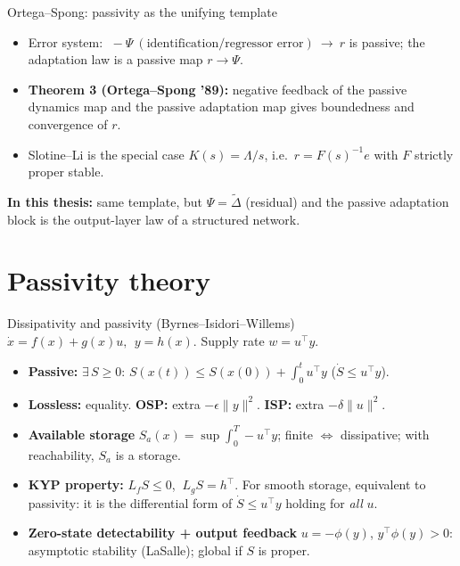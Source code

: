 \documentclass[aspectratio=169,10pt]{beamer}
\begin{document}
\begin{frame}{Ortega--Spong: passivity as the unifying template}
\begin{itemize}
\item Error system: $\;-\Psi\ (\text{identification/regressor error})\ \to\ r$ is passive; the adaptation law is a passive map $r\to\Psi$.
\item \textbf{Theorem 3 (Ortega--Spong '89):} negative feedback of the passive dynamics map and the passive adaptation map gives boundedness and convergence of $r$.
\item Slotine--Li is the special case $K(s)=\Lambda/s$, i.e.\ $r=F(s)^{-1}e$ with $F$ strictly proper stable.
\end{itemize}
\vspace{1mm}
\begin{center}
\end{center}
\textbf{In this thesis:} same template, but $\Psi=\tilde\Delta$ (residual) and the passive adaptation block is the output-layer law of a structured network.
\end{frame}

\section{Passivity theory}
\begin{frame}{Dissipativity and passivity (Byrnes--Isidori--Willems)}
$\dot x=f(x)+g(x)u,\ \ y=h(x)$. Supply rate $w=u^\top y$.
\begin{itemize}
\item \textbf{Passive:} $\exists\,S\ge0$: $S(x(t))\le S(x(0))+\int_0^tu^\top y$ \quad($\dot S\le u^\top y$).
\item \textbf{Lossless:} equality. \textbf{OSP:} extra $-\epsilon\|y\|^2$. \textbf{ISP:} extra $-\delta\|u\|^2$.
\item \textbf{Available storage} $S_a(x)=\sup\int_0^T -u^\top y$; finite $\iff$ dissipative; with reachability, $S_a$ is a storage.
\item \textbf{KYP property:} $L_fS\le0$, $\ L_gS=h^\top$. For smooth storage, equivalent to passivity: it is the differential form of $\dot S\le u^\top y$ holding for \emph{all} $u$.
\item \textbf{Zero-state detectability + output feedback} $u=-\phi(y)$, $y^\top\phi(y)>0$: asymptotic stability (LaSalle); global if $S$ is proper.
\end{itemize}
\end{frame}
\end{document}
